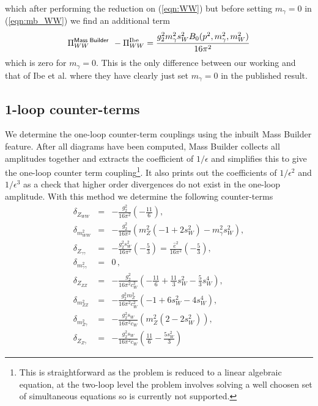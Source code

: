\documentclass[11pt]{article}
\newcommand{\mb}{\textsf{Mass Builder} \! }
\begin{document}
which after performing the reduction on (\ref{eqn:WW}) but before setting $m_{\gamma}=0$ in (\ref{eqn:mb_WW}) we find an additional term
\begin{align}
\Pi_{WW}^{\text{\mb}}  - \Pi_{WW}^{\text{Ibe}}  =\frac{g_2^2 m_{\gamma}^2 s_W^2 B_0(p^2,m_{\gamma}^2,m_W^2)}{16 \pi^2}
\end{align}
which is zero for $m_{\gamma}=0$.  This is the only difference between our working and that of Ibe et al. where they have clearly just set $m_{\gamma}=0$ in the published result.



\subsection{1-loop counter-terms}

We determine the one-loop counter-term couplings using the inbuilt Mass Builder feature.  After all diagrams have been computed, Mass Builder collects all amplitudes together and extracts the coefficient of $1/\epsilon$ and simplifies this to give the one-loop counter term coupling\footnote{This is straightforward as the problem is reduced to a linear algebraic equation, at the two-loop level the problem involves solving a well choosen set of simultaneous equations so is currently not supported.}.  It also prints out the coefficients of $1/\epsilon^2$ and $1/\epsilon^3$ as a check that higher order divergences do not exist in the one-loop amplitude.  With this method we determine the following counter-terms
\begin{eqnarray}
\delta_{Z_{WW}} &=&- \frac{g_2^2}{16 \pi^2}\left(-\frac{11}{6}\right),\\
\delta_{m^2_{WW}}&=&- \frac{g_2^2}{16 \pi^2} \left( m^2_Z(-1+2s_W^2)     -m_{\gamma}^2s_W^2\right),\\
\delta_{Z_{\gamma\gamma}} &=&-\frac{g_2^2s_W^2}{16 \pi^2}\left(-\frac{5}{3}\right) = \frac{\hat{e}^2}{16\pi^2}\left(-\frac{5}{3}\right) , \\
\delta_{m^2_{\gamma\gamma}} &=& 0\, ,\\
\delta_{Z_{ZZ}} &=&-\frac{g_2^2}{16 \pi^2 c_W^2} \left(-\frac{11}{6}+\frac{11}{3}s_W^2-\frac{5}{3}s_W^4  \right),\\
\delta_{m^2_{ZZ}} &=& -\frac{g_2^2m_Z^2}{16 \pi^2c_W^2} \left(-1+6s_W^2-4s_W^4  \right),\\
\delta_{m^2_{Z\gamma}} &=& -\frac{g_2^2s_W}{16 \pi^2c_W} \left( m_Z^2(2-2s_W^2)  \right),\\
\delta_{Z_{Z\gamma}} &=& -\frac{g_2^2s_W}{16 \pi^2c_W} \left( \frac{11}{6}-\frac{5s_W^2}{3}  \right)
\end{eqnarray}
\end{document}
